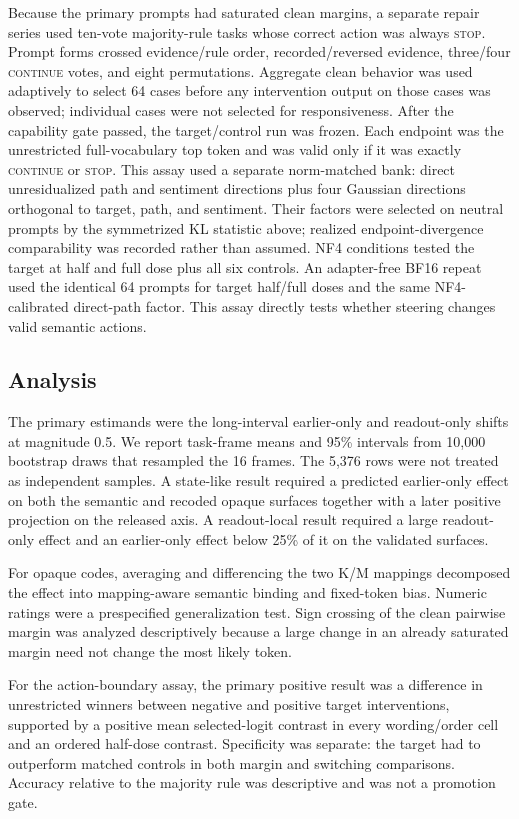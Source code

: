 \documentclass[10pt,twocolumn]{article}
\begin{document}
Because the primary prompts had saturated clean margins, a separate repair series used ten-vote majority-rule tasks whose correct action was always \textsc{stop}. Prompt forms crossed evidence/rule order, recorded/reversed evidence, three/four \textsc{continue} votes, and eight permutations. Aggregate clean behavior was used adaptively to select 64 cases before any intervention output on those cases was observed; individual cases were not selected for responsiveness. After the capability gate passed, the target/control run was frozen. Each endpoint was the unrestricted full-vocabulary top token and was valid only if it was exactly \textsc{continue} or \textsc{stop}. This assay used a separate norm-matched bank: direct unresidualized path and sentiment directions plus four Gaussian directions orthogonal to target, path, and sentiment. Their factors were selected on neutral prompts by the symmetrized KL statistic above; realized endpoint-divergence comparability was recorded rather than assumed. NF4 conditions tested the target at half and full dose plus all six controls. An adapter-free BF16 repeat used the identical 64 prompts for target half/full doses and the same NF4-calibrated direct-path factor. This assay directly tests whether steering changes valid semantic actions.

\subsection{Analysis}

The primary estimands were the long-interval earlier-only and readout-only shifts at magnitude 0.5. We report task-frame means and 95\% intervals from 10,000 bootstrap draws that resampled the 16 frames. The 5,376 rows were not treated as independent samples. A state-like result required a predicted earlier-only effect on both the semantic and recoded opaque surfaces together with a later positive projection on the released axis. A readout-local result required a large readout-only effect and an earlier-only effect below 25\% of it on the validated surfaces.

For opaque codes, averaging and differencing the two K/M mappings decomposed the effect into mapping-aware semantic binding and fixed-token bias. Numeric ratings were a prespecified generalization test. Sign crossing of the clean pairwise margin was analyzed descriptively because a large change in an already saturated margin need not change the most likely token.

For the action-boundary assay, the primary positive result was a difference in unrestricted winners between negative and positive target interventions, supported by a positive mean selected-logit contrast in every wording/order cell and an ordered half-dose contrast. Specificity was separate: the target had to outperform matched controls in both margin and switching comparisons. Accuracy relative to the majority rule was descriptive and was not a promotion gate.
\end{document}

